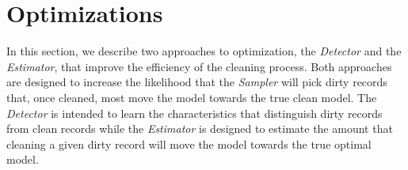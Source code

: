 \section{Optimizations}\label{opti}


In this section, we describe two approaches to optimization, the {\it Detector} and the {\it Estimator}, that
improve the efficiency of the cleaning process.  
Both approaches are designed to increase the likelihood that the 
{\it Sampler} will pick dirty records that, once cleaned,
most move the model towards the true clean model.
The {\it Detector} is intended to learn the characteristics that distinguish dirty records from clean records
while the {\it Estimator} is designed to estimate the amount that cleaning a given dirty record will move the 
model towards the true optimal model.





